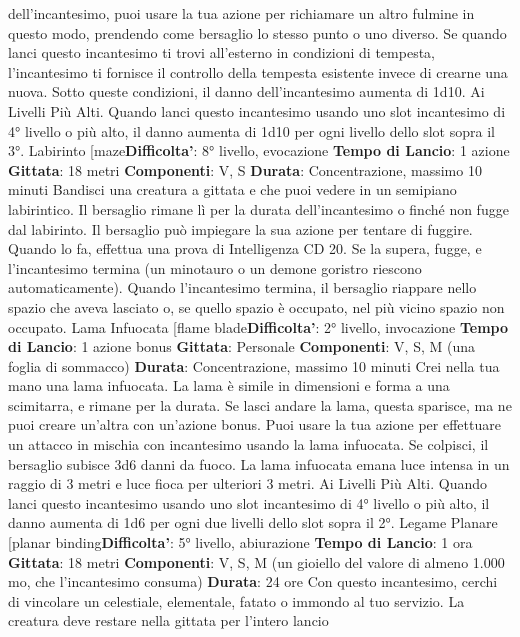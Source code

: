 \begin{multicols}{2}
dell’incantesimo, puoi usare la tua azione per
richiamare un altro fulmine in questo modo, prendendo
come bersaglio lo stesso punto o uno diverso.
Se quando lanci questo incantesimo ti trovi all’esterno
in condizioni di tempesta, l’incantesimo ti fornisce il
controllo della tempesta esistente invece di crearne una
nuova. Sotto queste condizioni, il danno
dell’incantesimo aumenta di 1d10.
Ai Livelli Più Alti. Quando lanci questo incantesimo
usando uno slot incantesimo di 4° livello o più alto, il
danno aumenta di 1d10 per ogni livello dello slot sopra
il 3°.
Labirinto
[maze\textbf{Difficolta'}:
8° livello, evocazione
\textbf{Tempo di Lancio}: 1 azione
\textbf{Gittata}: 18 metri
\textbf{Componenti}: V, S
\textbf{Durata}: Concentrazione, massimo 10 minuti
Bandisci una creatura a gittata e che puoi vedere in un
semipiano labirintico. Il bersaglio rimane lì per la durata
dell’incantesimo o finché non fugge dal labirinto.
Il bersaglio può impiegare la sua azione per tentare di
fuggire. Quando lo fa, effettua una prova di Intelligenza
CD 20. Se la supera, fugge, e l’incantesimo termina (un
minotauro o un demone goristro riescono
automaticamente).
Quando l’incantesimo termina, il bersaglio riappare
nello spazio che aveva lasciato o, se quello spazio è
occupato, nel più vicino spazio non occupato.
Lama Infuocata
[flame blade\textbf{Difficolta'}:
2° livello, invocazione
\textbf{Tempo di Lancio}: 1 azione bonus
\textbf{Gittata}: Personale
\textbf{Componenti}: V, S, M (una foglia di sommacco)
\textbf{Durata}: Concentrazione, massimo 10 minuti
Crei nella tua mano una lama infuocata. La lama è
simile in dimensioni e forma a una scimitarra, e rimane
per la durata. Se lasci andare la lama, questa sparisce,
ma ne puoi creare un’altra con un’azione bonus.
Puoi usare la tua azione per effettuare un attacco in
mischia con incantesimo usando la lama infuocata. Se
colpisci, il bersaglio subisce 3d6 danni da fuoco.
La lama infuocata emana luce intensa in un raggio di 3
metri e luce fioca per ulteriori 3 metri.
Ai Livelli Più Alti. Quando lanci questo incantesimo
usando uno slot incantesimo di 4° livello o più alto, il
danno aumenta di 1d6 per ogni due livelli dello slot
sopra il 2°.
Legame Planare
[planar binding\textbf{Difficolta'}:
5° livello, abiurazione
\textbf{Tempo di Lancio}: 1 ora
\textbf{Gittata}: 18 metri
\textbf{Componenti}: V, S, M (un gioiello del valore di almeno
1.000 mo, che l’incantesimo consuma)
\textbf{Durata}: 24 ore
Con questo incantesimo, cerchi di vincolare un
celestiale, elementale, fatato o immondo al tuo servizio.
La creatura deve restare nella gittata per l’intero lancio

\end{multicols}
